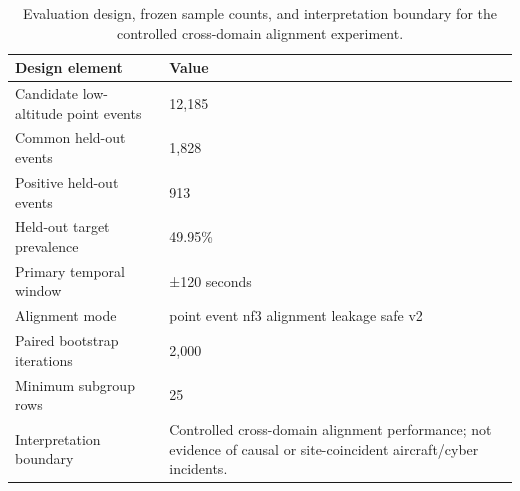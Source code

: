 \begin{table}
\caption{Evaluation design, frozen sample counts, and interpretation boundary for the controlled cross-domain alignment experiment.}
\label{tab:evaluation-design}
\begin{tabular}{ll}
\toprule
Design element & Value \\
\midrule
Candidate low-altitude point events & 12,185 \\
Common held-out events & 1,828 \\
Positive held-out events & 913 \\
Held-out target prevalence & 49.95\% \\
Primary temporal window & ±120 seconds \\
Alignment mode & point event nf3 alignment leakage safe v2 \\
Paired bootstrap iterations & 2,000 \\
Minimum subgroup rows & 25 \\
Interpretation boundary & Controlled cross-domain alignment performance; not evidence of causal or site-coincident aircraft/cyber incidents. \\
\bottomrule
\end{tabular}
\end{table}

